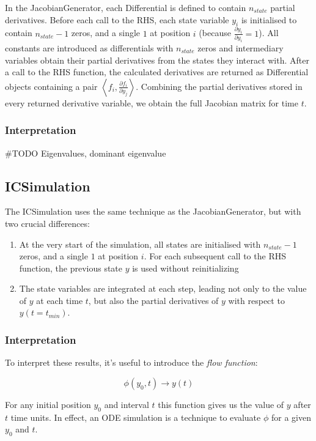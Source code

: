 In the JacobianGenerator, each Differential is defined to contain
$n_{state}$ partial derivatives. Before each call to the RHS, each
state variable $y_{i}$ is initialised to contain $n_{state}-1$ zeros,
and a single $1$ at position $i$ (because $\frac{\partial y_{i}}{\partial y_{i}}=1$).
All constants are introduced as differentials with $n_{state}$ zeros
and intermediary variables obtain their partial derivatives from the
states they interact with. After a call to the RHS function, the calculated
derivatives are returned as Differential objects containing a pair
$\left\langle f_{i},\frac{\partial f_{i}}{\partial y_{j}}\right\rangle $.
Combining the partial derivatives stored in every returned derivative
variable, we obtain the full Jacobian matrix for time $t$.


\subsubsection{Interpretation}

\#TODO Eigenvalues, dominant eigenvalue


\subsection{ICSimulation}

The ICSimulation uses the same technique as the JacobianGenerator,
but with two crucial differences:
\begin{enumerate}
\item At the very start of the simulation, all states are initialised with
$n_{state}-1$ zeros, and a single $1$ at position $i$. For each
subsequent call to the RHS function, the previous state $y$ is used
without reinitializing
\item The state variables are integrated at each step, leading not only
to the value of $y$ at each time $t$, but also the partial derivatives
of $y$ with respect to $y\left(t=t_{min}\right)$.
\end{enumerate}

\subsubsection{Interpretation}

To interpret these results, it's useful to introduce the \emph{flow
function}:
\begin{linenomath}
\begin{equation}
\phi\left(y_{0},t\right)\rightarrow y\left(t\right)
\end{equation}
\end{linenomath}
For any initial position $y_{0}$ and interval $t$ this function
gives us the value of $y$ after $t$ time units. In effect, an ODE
simulation is a technique to evaluate $\phi$ for a given $y_{0}$
and $t$.

